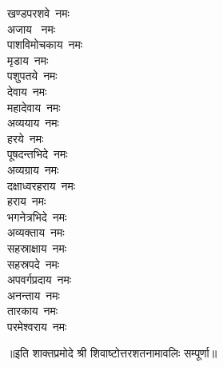 \begin{multicols}{2}
\begin{flushleft}
खण्डपरशवे~नमः\\
अजाय ~नमः\\
पाशविमोचकाय~नमः\hfill{}\\
मृडाय~नमः\\
पशुपतये~नमः\\
देवाय~नमः\\
महादेवाय~नमः\\
अव्ययाय~नमः\\
हरये~नमः\\
पूषदन्तभिदे~नमः\\
अव्यग्राय~नमः\\
दक्षाध्वरहराय~नमः\\
हराय~नमः\hfill{}\\
भगनेत्रभिदे~नमः\\
अव्यक्ताय~नमः\\
सहस्राक्षाय~नमः\\
सहस्रपदे~नमः\\
अपवर्गप्रदाय~नमः\\
अनन्ताय~नमः\\
तारकाय~नमः\\
परमेश्वराय~नमः\\
\end{flushleft}
\end{multicols}
॥इति शाक्तप्रमोदे श्री शिवाष्टोत्तरशतनामावलिः सम्पूर्णा॥
